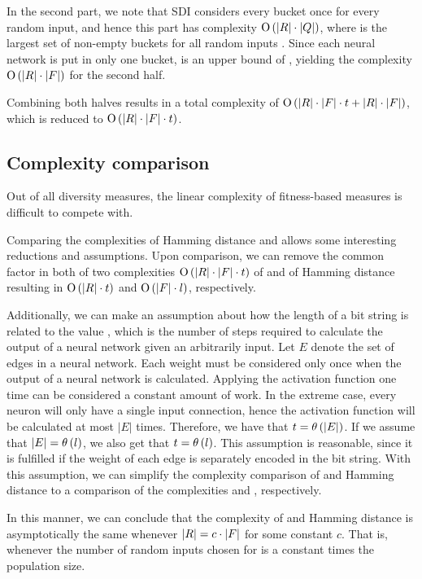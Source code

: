 In the second part, we note that SDI considers every bucket once for every random input, and hence this part has complexity $\operatorname{O}\left(\lvert R\rvert\cdot\lvert Q\rvert\right)$, where \nemptyspeciesset{} is the largest set of non-empty buckets for all random inputs \ranset. Since each neural network is put in only one bucket, \indsetl{} is an upper bound of \nemptyspeciessetl, yielding the complexity $\operatorname{O}\left(\lvert R\rvert\cdot\lvert F\rvert\right)$ for the second half.

Combining both halves results in a total complexity of $\operatorname{O}\left(\lvert R\rvert \cdot \lvert F\rvert \cdot t + \lvert R\rvert \cdot \lvert F\rvert\right)$, which is reduced to $\operatorname{O}\left(\lvert R\rvert\cdot\lvert F\rvert\cdot t\right)$.

\subsection{Complexity comparison}
Out of all diversity measures, the linear complexity of fitness-based measures is difficult to compete with.

Comparing the complexities of Hamming distance and \dia{} allows some interesting reductions and assumptions. Upon comparison, we can remove the common factor \indset{} in both of two complexities $\operatorname{O}\left(\lvert R\rvert\cdot\lvert F\rvert\cdot t\right)$ of \dia{} and \bigO{\indsetl^2 \cdot \bitstringl} of Hamming distance resulting in $\operatorname{O}\left(\lvert R\rvert \cdot t\right)$ and $\operatorname{O}\left(\lvert F\rvert \cdot l\right)$, respectively. 

Additionally, we can make an assumption about how the length of a bit string \bitstringl{} is related to the value \timet, which is the number of steps required to calculate the output of a neural network given an arbitrarily input. Let $E$ denote the set of edges in a neural network. Each weight must be considered only once when the output of a neural network is calculated. Applying the activation function one time can be considered a constant amount of work. In the extreme case, every neuron will only have a single input connection, hence the activation function will be calculated at most $|E|$ times. Therefore, we have that $t = \theta\left(\lvert E\rvert\right)$. If we assume that $\lvert E\rvert = \theta\left(l\right)$, we also get that $t = \theta\left(l\right)$. This assumption is reasonable, since it is fulfilled if the weight of each edge is separately encoded in the bit string. With this assumption, we can simplify the complexity comparison of \dia{} and Hamming distance to a comparison of the complexities \bigO{\ransetl} and \bigO{\indsetl}, respectively.

In this manner, we can conclude that the complexity of \dia{} and Hamming distance is asymptotically the same whenever $\lvert R\rvert = c \cdot \lvert F\rvert$ for some constant $c$. That is, whenever the number of random inputs chosen for \dia{} is a constant times the population size.

